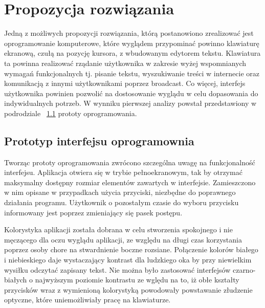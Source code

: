 \documentclass[twoside,a4paper]{book}
\begin{document}
\section{Propozycja rozwiązania}
Jedną z możliwych propozycji rozwiązania, którą postanowiono zrealizować jest oprogramowanie komputerowe, które wyglądem przypominać powinno klawiaturę ekranową, czułą na pozycję kursora, z wbudowanym edytorem tekstu. Klawiatura ta powinna realizować rządanie użytkownika w zakresie wyżej wspomnianych wymagań funkcjonalnych tj. pisanie tekstu, wyszukiwanie treści w internecie oraz komunikacją z innymi użytkownikami poprzez broadcast. Co więcej, interfejs użytkownika powinien pozwolić na dostosowanie wyglądu w celu dopasowania do indywidualnych potrzeb. W wynniku pierwszej analizy powstał przedstawiony w podrodziale ~\ref{sec:key} prototy oprogramowania. 
\subsection{Prototyp interfejsu oprogramownia}\label{sec:key}
Tworząc prototy oprogramowania zwrócono szczególna uwagę na funkcjonalność interfejsu. Aplikacja otwiera się w trybie pełnoekranowym, tak by otrzymać maksymalny dostępny rozmiar elementów zawartych w interfejsie. Zamieszczono w nim opisane w przypadkach użycia przyciski, niezbędne do poprawnego działania programu. Użytkownik o pozostałym czasie do wyboru przycisku informowany jest poprzez zmieniający się pasek postępu. 

Kolorystyka aplikacji została dobrana w celu stworzenia spokojnego i nie męczącego dla oczu wyglądu aplikacji, ze względu na długi czas korzystania poprzez osoby chore na stwardnienie boczne rozsiane. Połączenie kolorów białego i niebieskiego daje wystaczający kontrast dla ludzkiego oka by przy niewielkim wysiłku odczytać zapisany tekst. Nie można było zastosować interfejsów czarno-białych o najwyższym poziomie kontrastu ze wględu na to, iż obłe kształty przycisków wraz z wymienioną kolorystyką powodowały powstawanie złudzenie optyczne, które uniemożliwiały pracę na klawiaturze. 
\end{document}
